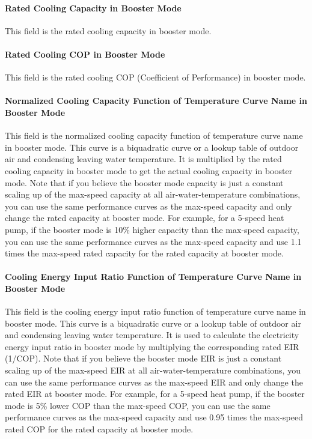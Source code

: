 \paragraph{Rated Cooling Capacity in Booster Mode} This field is the rated
cooling capacity in booster mode.
\paragraph{Rated Cooling COP in Booster Mode} This field is the rated cooling
COP (Coefficient of Performance) in booster mode.
\paragraph{Normalized Cooling Capacity Function of Temperature Curve Name in
Booster Mode} This field is the normalized cooling capacity function of
temperature curve name in booster mode. This curve is a biquadratic curve or a
lookup table of outdoor air and condensing leaving water temperature. It is
multiplied by the rated cooling capacity in booster mode to get the actual
cooling capacity in booster mode. Note that if you believe the booster mode
capacity is just a constant scaling up of the max-speed capacity at all
air-water-temperature combinations, you can use the same performance curves as
the max-speed capacity and only change the rated capacity at booster mode.
For example, for a 5-speed heat pump, if the booster mode is 10\% higher capacity
than the max-speed capacity, you can use the same performance curves as the max-speed
capacity and use 1.1 times the max-speed rated capacity for the rated capacity at booster mode.
\paragraph{Cooling Energy Input Ratio Function of Temperature Curve Name in
Booster Mode} This field is the cooling energy input ratio function of
temperature curve name in booster mode. This curve is a biquadratic curve or a
lookup table of outdoor air and condensing leaving water temperature. It is used
to calculate the electricity energy input ratio in booster mode by multiplying
the corresponding rated EIR (1/COP). Note that if you believe the booster mode
EIR is just a constant scaling up of the max-speed EIR at all
air-water-temperature combinations, you can use the same performance curves as
the max-speed EIR and only change the rated EIR at booster mode.
For example, for a 5-speed heat pump, if the booster mode is 5\% lower COP
than the max-speed COP, you can use the same performance curves as the max-speed
capacity and use 0.95 times the max-speed rated COP for the rated capacity at booster mode.
